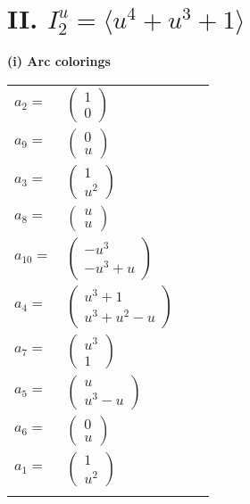 \documentclass[1p]{elsarticle_modified}
\theoremstyle{definition}
\begin{document}
\centering \section*{II. $I^u_{2}= \langle u^4+u^3+1 \rangle$}
\flushleft \textbf{(i) Arc colorings}\\
\begin{tabular}{m{7pt} m{180pt} m{7pt} m{180pt} }
\flushright $a_{2}=$&$\begin{pmatrix}1\\0\end{pmatrix}$ \\
\flushright $a_{9}=$&$\begin{pmatrix}0\\u\end{pmatrix}$ \\
\flushright $a_{3}=$&$\begin{pmatrix}1\\u^2\end{pmatrix}$ \\
\flushright $a_{8}=$&$\begin{pmatrix}u\\u\end{pmatrix}$ \\
\flushright $a_{10}=$&$\begin{pmatrix}- u^3\\- u^3+u\end{pmatrix}$ \\
\flushright $a_{4}=$&$\begin{pmatrix}u^3+1\\u^3+u^2- u\end{pmatrix}$ \\
\flushright $a_{7}=$&$\begin{pmatrix}u^3\\1\end{pmatrix}$ \\
\flushright $a_{5}=$&$\begin{pmatrix}u\\u^3- u\end{pmatrix}$ \\
\flushright $a_{6}=$&$\begin{pmatrix}0\\u\end{pmatrix}$ \\
\flushright $a_{1}=$&$\begin{pmatrix}1\\u^2\end{pmatrix}$\\&\end{tabular}
\end{document}
